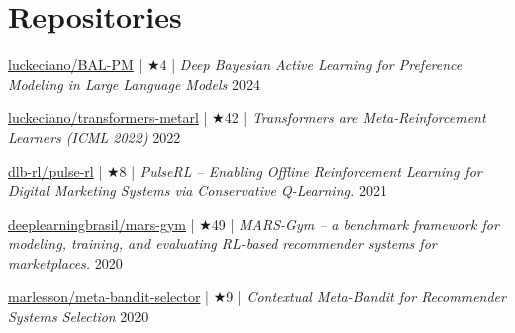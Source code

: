\documentclass[11pt,letter,sans,colorlinks,linkcolor=true]{moderncv}
\begin{document}
\section{Repositories}
    \href{https://github.com/luckeciano/BAL-PM}{luckeciano/BAL-PM} | $\bigstar$4 |
    \emph{Deep Bayesian Active Learning for Preference Modeling in Large Language Models} \hfill
    2024 \par
    \href{https://github.com/luckeciano/transformers-metarl}{luckeciano/transformers-metarl} | $\bigstar$42 |
    \emph{Transformers are Meta-Reinforcement Learners (ICML 2022)} \hfill
    2022 \par
    \href{https://github.com/dlb-rl/pulse-rl}{dlb-rl/pulse-rl} | $\bigstar$8 |
    \emph{PulseRL -- Enabling Offline Reinforcement Learning for Digital Marketing Systems via Conservative Q-Learning.} \hfill
    2021 \par
    \href{https://github.com/deeplearningbrasil/mars-gym}{deeplearningbrasil/mars-gym} | $\bigstar$49 |
    \emph{MARS-Gym -- a benchmark framework for modeling, training, and evaluating RL-based recommender systems for marketplaces.} \hfill
    2020 \par
    \href{https://github.com/marlesson/meta-bandit-selector}{marlesson/meta-bandit-selector} | $\bigstar$9 |
    \emph{Contextual Meta-Bandit for Recommender Systems Selection} \hfill
    2020 \par
\end{document}
